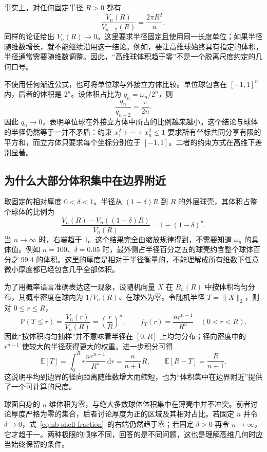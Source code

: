 \documentclass[UTF8]{ctexart}
\begin{document}
事实上，对任何固定半径 $R>0$ 都有
\[
  \frac{V_n(R)}{V_{n-2}(R)}=\frac{2\pi R^2}{n},
\]
同样的论证给出 $V_n(R)\to0$。这里要求半径固定且使用同一长度单位；如果半径随维数增长，就不能继续沿用这一结论。例如，要让高维球始终具有指定的体积，半径通常需要随维数调整。因此，“高维球体积趋于零”不是一个脱离尺度约定的几何口号。

不使用任何渐近公式，也可将单位球与外接立方体比较。单位球包含在 $[-1,1]^n$ 内，后者的体积是 $2^n$。设体积占比为 $q_n=\omega_n/2^n$，则
\[
  \frac{q_n}{q_{n-2}}=\frac{\pi}{2n}.
\]
因此 $q_n\to0$，表明单位球在外接立方体中所占的比例越来越小。这个结论与球体的半径仍然等于一并不矛盾：约束 $x_1^2+\cdots+x_n^2\leq1$ 要求所有坐标共同分享有限的平方和，而立方体只要求每个坐标分别位于 $[-1,1]$。二者的约束方式在高维下差别显著。

\subsection{为什么大部分体积集中在边界附近}

取固定的相对厚度 $0<\delta<1$。半径从 $(1-\delta)R$ 到 $R$ 的外层球壳，其体积占整个球体的比例为
\begin{equation}\label{eq:nb-shell-fraction}
  \frac{V_n(R)-V_n((1-\delta)R)}{V_n(R)}
  =1-(1-\delta)^n.
\end{equation}
当 $n\to\infty$ 时，右端趋于 $1$。这个结果完全由缩放规律得到，不需要知道 $\omega_n$ 的具体值。例如 $n=100$、$\delta=0.05$ 时，最外侧占半径百分之五的球壳约含整个球体百分之 $99.4$ 的体积。这里的厚度是相对于半径衡量的，不能理解成所有维数下任意微小厚度都已经包含几乎全部体积。

为了用概率语言准确表达这一现象，设随机向量 $X$ 在 $B_n(R)$ 中按体积均匀分布，其概率密度在球内为 $1/V_n(R)$、在球外为零。令随机半径 $T=\|X\|_2$，则对 $0\leq r\leq R$，
\[
  \mathbb P(T\leq r)=\frac{V_n(r)}{V_n(R)}
  =\left(\frac rR\right)^n,
  \qquad f_T(r)=\frac{nr^{n-1}}{R^n}\quad(0<r<R).
\]
因此“按体积均匀抽样”并不意味着半径在 $[0,R]$ 上均匀分布；径向密度中的 $r^{n-1}$ 使较大的半径获得更大的权重。进一步积分可得
\[
  \mathbb E[T]=\int_0^Rr\frac{nr^{n-1}}{R^n}\,\mathrm dr
  =\frac{n}{n+1}R,\qquad
  \mathbb E[R-T]=\frac{R}{n+1}.
\]
这说明平均到边界的径向距离随维数增大而缩短，也为“体积集中在边界附近”提供了一个可计算的尺度。

球面自身的 $n$ 维体积为零，与绝大多数球体体积集中在薄壳中并不冲突。前者讨论厚度严格为零的集合，后者讨论厚度为正的区域及其相对占比。若固定 $n$ 并令 $\delta\to0$，式~\eqref{eq:nb-shell-fraction}~的右端仍然趋于零；若固定 $\delta>0$ 再令 $n\to\infty$，它才趋于一。两种极限的顺序不同，回答的是不同问题，这也是理解高维几何时应当始终保留的条件。
\end{document}
